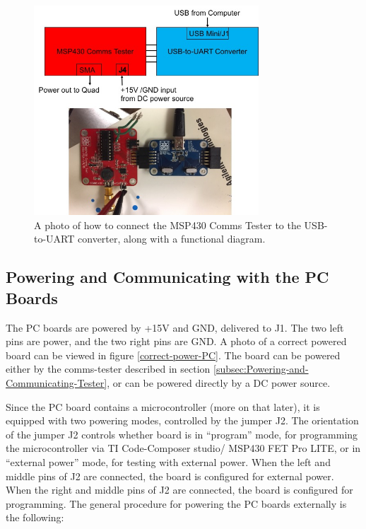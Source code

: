 \documentclass[letter,12pt]{article}
\begin{document}
\begin{figure}
\begin{centering}
\includegraphics[width=0.75\textwidth]{photos/CommsTester_and_USBtoUART-Diagram.jpg}
\par\end{centering}
\caption{A photo of how to connect the MSP430 Comms Tester to the USB-to-UART
converter, along with a functional diagram.}
\label{CommsTester_and_USBtoUART}
\end{figure}

\subsection{Powering and Communicating with the PC Boards}

The PC boards are powered by +15V and GND, delivered to J1. The two left pins are power, and the two right pins are GND. A photo of a correct powered board can be viewed in figure \ref{correct-power-PC}. The board can be powered either by the comms-tester described in section \ref{subsec:Powering-and-Communicating-Tester}, or can be powered directly by a DC power source.

Since the PC board contains a microcontroller (more on that later), it is equipped with two powering modes, controlled by the jumper J2. The orientation of the jumper J2 controls whether board is in ``program'' mode, for programming the microcontroller via TI Code-Composer studio/ MSP430 FET Pro LITE, or in ``external power'' mode, for testing with external power. When the left and middle pins of J2 are connected, the board is configured for external power. When the right and middle pins of J2 are connected, the board is configured for programming. The general procedure for powering the PC boards externally is the following:
\end{document}
